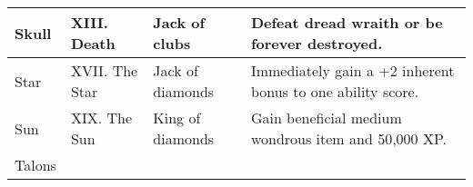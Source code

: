 \begin{longtable}{llllllll}
\hline
\multicolumn{5}{p{2.168in}|}{\begin{minipage}[t]{2.168in}\raggedright
Skull\end{minipage}} & \multicolumn{1}{|p{0.460in}|}{\begin{minipage}[t]{0.460in}\raggedright
XIII. Death\end{minipage}} & \multicolumn{1}{p{0.872in}|}{\begin{minipage}[t]{0.872in}\raggedright
Jack of clubs\end{minipage}} & \multicolumn{1}{p{1.000in}|}{\begin{minipage}[t]{1.000in}\raggedright
Defeat dread wraith or be forever destroyed.\end{minipage}}\\
\hline
\multicolumn{5}{p{2.168in}|}{\begin{minipage}[t]{2.168in}\raggedright
Star\end{minipage}} & \multicolumn{1}{|p{0.460in}|}{\begin{minipage}[t]{0.460in}\raggedright
XVII. The Star\end{minipage}} & \multicolumn{1}{p{0.872in}|}{\begin{minipage}[t]{0.872in}\raggedright
Jack of diamonds\end{minipage}} & \multicolumn{1}{p{1.000in}|}{\begin{minipage}[t]{1.000in}\raggedright
Immediately gain a +2 inherent bonus to one ability score.\end{minipage}}\\
\hline
\multicolumn{5}{p{2.168in}|}{\begin{minipage}[t]{2.168in}\raggedright
Sun\end{minipage}} & \multicolumn{1}{|p{0.460in}|}{\begin{minipage}[t]{0.460in}\raggedright
XIX. The Sun\end{minipage}} & \multicolumn{1}{p{0.872in}|}{\begin{minipage}[t]{0.872in}\raggedright
King of diamonds\end{minipage}} & \multicolumn{1}{p{1.000in}|}{\begin{minipage}[t]{1.000in}\raggedright
Gain beneficial medium wondrous item and 50,000 XP.\end{minipage}}\\
\hline
\multicolumn{5}{p{2.168in}|}{\begin{minipage}[t]{2.168in}\raggedright
Talons\end{minipage}} & \multicolumn{1}{|p{0.460in}|}{\begin{minipage}[t]{0.460in}\raggedright

\end{minipage}}
\end{longtable}
